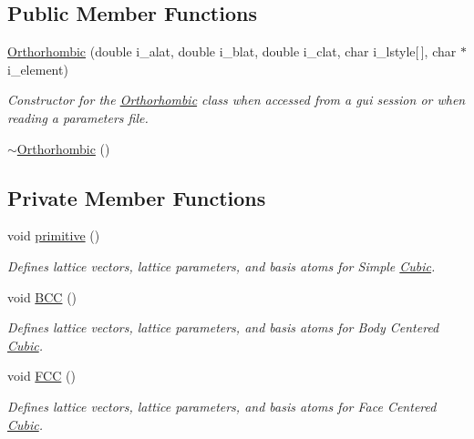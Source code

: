 \subsection*{Public Member Functions}
\begin{DoxyCompactItemize}
\item 
\hyperlink{class_orthorhombic_a39f258370aaba742e7af9eb06fa15926}{Orthorhombic} (double i\+\_\+alat, double i\+\_\+blat, double i\+\_\+clat, char i\+\_\+lstyle\mbox{[}$\,$\mbox{]}, char $\ast$i\+\_\+element)
\begin{DoxyCompactList}\small\item\em Constructor for the \hyperlink{class_orthorhombic}{Orthorhombic} class when accessed from a gui session or when reading a parameters file. \end{DoxyCompactList}\item 
\hyperlink{class_orthorhombic_a36b36bb0a5fa04710aa934749fca1a21}{$\sim$\+Orthorhombic} ()
\end{DoxyCompactItemize}
\subsection*{Private Member Functions}
\begin{DoxyCompactItemize}
\item 
void \hyperlink{class_orthorhombic_ae95c1c0450eda0f01718ec52fec1a59c}{primitive} ()
\begin{DoxyCompactList}\small\item\em Defines lattice vectors, lattice parameters, and basis atoms for Simple \hyperlink{class_cubic}{Cubic}. \end{DoxyCompactList}\item 
void \hyperlink{class_orthorhombic_af7d8ab9b44633b12bf6d1f87554a8615}{B\+C\+C} ()
\begin{DoxyCompactList}\small\item\em Defines lattice vectors, lattice parameters, and basis atoms for Body Centered \hyperlink{class_cubic}{Cubic}. \end{DoxyCompactList}\item 
void \hyperlink{class_orthorhombic_af070eba51ade7d800bfc5adae33604e5}{F\+C\+C} ()
\begin{DoxyCompactList}\small\item\em Defines lattice vectors, lattice parameters, and basis atoms for Face Centered \hyperlink{class_cubic}{Cubic}. \end{DoxyCompactList}\end{DoxyCompactItemize}
